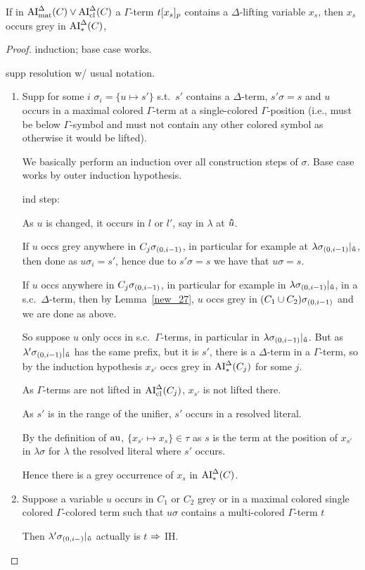 \documentclass[,%
	paper=a4,%
	DIV11, %
	twoside=false,%
	liststotoc,
	bibtotoc,
	draft=false,%
	numbers=noendperiod
]{scrartcl}
\begin{document}
\begin{clemma}
	If in $\operatorname{AI}_\mathrm{mat}^\Delta(C) \lor \operatorname{AI}_\mathrm{cl}^\Delta(C)$ a
	$\Gamma$-term $t{[x_s]_{p}}$ contains a $\Delta$-lifting variable $x_s$, then $x_s$ occurs grey in $\operatorname{AI}_\mathrm{*}^\Delta(C)$,

\end{clemma}
\begin{proof}
	induction; base case works.

	supp resolution w/ usual notation.

	\begin{enumerate}
		\item Supp for some $i$ $\sigma_i = \{ u \mapsto s' \}$ s.t.\ $s'$ contains a $\Delta$-term, $s'\sigma = s$ and $u$ occurs in a maximal colored $\Gamma$-term at a single-colored $\Gamma$-position (i.e., must be below $\Gamma$-symbol and must not contain any other colored symbol as otherwise it would be lifted).

			We basically perform an induction over all construction steps of $\sigma$. Base case works by outer induction hypothesis.

			ind step:

			As $u$ is changed, it occurs in $l$ or $l'$, say in $\lambda$ at $\bm\hat u$.

			If $u$ occs grey anywhere in $C_{j}\sigma_{(0,i-1)}$, in particular for example at $\lambda\sigma_{(0,i-1)}|_{\bm\hat u}$, then done as $u\sigma_i = s'$, hence due to $s'\sigma=s$ we have that $u\sigma = s$.


			If $u$ occs anywhere in $C_{j}\sigma_{(0,i-1)}$, in particular for example in $\lambda\sigma_{(0,i-1)}|_{\bm\hat u}$, in a s.c.\ $\Delta$-term, then by Lemma~\ref{new_27}, $u$ occs grey in $(C_1\cup C_2)\sigma_{(0,i-1)}$ and we are done as above.

			So suppose $u$ only occs in s.c.\ $\Gamma$-terms, in particular in $\lambda\sigma_{(0,i-1)}|_{\bm\hat u}$. 
			But as $\lambda'\sigma_{(0,i-1)}|_{\bm\hat u}$ has the same prefix, but it is $s'$, there is a $\Delta$-term in a $\Gamma$-term, so by the induction hypothesis $x_{s'}$ occs grey in $\operatorname{AI}_\mathrm{*}^\Delta(C_j)$ for some $j$.

			As $\Gamma$-terms are not lifted in $\operatorname{AI}_\mathrm{cl}^\Delta(C_j)$, $x_{s'}$ is not lifted there.

			As $s'$ is in the range of the unifier, $s'$ occurs in a resolved literal. 

			By the definition of $\operatorname{au}$, $\{x_{s'} \mapsto x_s\} \in \tau$
			as $s$ is the term at the position of $x_{s'}$ in $\lambda\sigma$ for $\lambda$ the resolved literal where $s'$ occurs.

			Hence there is a grey occurrence of $x_s$ in $\operatorname{AI}_\mathrm{*}^\Delta(C)$.

		\item
			Suppose a variable $u$ occurs in $C_1$ or $C_2$ grey or in a maximal colored single colored $\Gamma$-colored term such that $u\sigma$ contains a multi-colored $\Gamma$-term $t$ 

			Then $\lambda'\sigma_{(0,i-)}|_{\bm\hat{u}}$ actually is $t$ $\Rightarrow$ IH.
			\qedhere

	\end{enumerate}
\end{proof}
\end{document}
